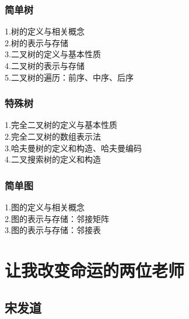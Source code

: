 \documentclass[12pt,twiside,a4paper]{ctexbook}
\numberwithin{chapter}{part}
\begin{document}
\subsection{简单树}
1.树的定义与相关概念\\
2.树的表示与存储\\
3.二叉树的定义与基本性质\\
4.二叉树的表示与存储\\
5.二叉树的遍历：前序、中序、后序

\subsection{特殊树}
1.完全二叉树的定义与基本性质\\
2.完全二叉树的数组表示法\\
3.哈夫曼树的定义和构造、哈夫曼编码\\
4.二叉搜索树的定义和构造

\subsection{简单图}
1.图的定义与相关概念\\
2.图的表示与存储：邻接矩阵\\
3.图的表示与存储：邻接表


\subsection{}
\subsection{}
\subsection{}
\subsection{}


\chapter{让我改变命运的两位老师}
\section{宋发道}
\end{document}
